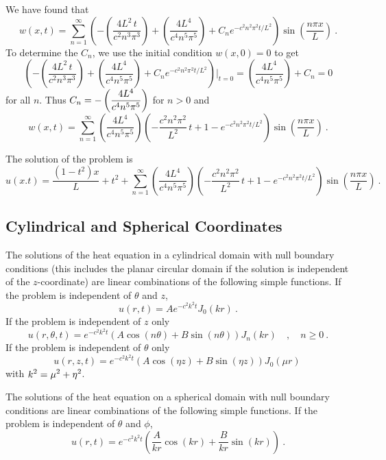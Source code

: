 \begin{egg}
We have found that
\[
w(x,t) = \sum_{n=1}^\infty \left(
-\left(\frac{4L^2\,t}{c^2n^3\pi^3}\right)
+ \left(\frac{4L^4}{c^4n^5\pi^5}\right) + C_n e^{-c^2n^2\pi^2 t/L^2}
\right) \sin\left(\frac{n\pi x}{L}\right) \  .
\]
To determine the $C_n$, we use the initial condition $w(x,0)=0$ to
get
\[
\left(-\left(\frac{4L^2\,t}{c^2n^3\pi^3}\right)
+ \left(\frac{4L^4}{c^4n^5\pi^5}\right) + C_n e^{-c^2n^2\pi^2 t/L^2}
\right)\bigg|_{t=0} = \left(\frac{4L^4}{c^4n^5\pi^5}\right) +
C_n = 0
\]
for all $n$.  Thus
$\displaystyle C_n = -\left(\frac{4L^4}{c^4n^5\pi^5}\right)$ for $n>0$
and
\[
w(x,t) = \sum_{n=1}^\infty \left(\frac{4L^4}{c^4n^5\pi^5}\right)
\left( -\frac{c^2n^2\pi^2}{L^2}\, t + 1 - e^{-c^2n^2\pi^2 t/L^2}\right)
\sin\left(\frac{n\pi x}{L}\right) \  .
\]

The solution of the problem is
\[
u(x.t) = \frac{(1-t^2)x}{L} + t^2 +
\sum_{n=1}^\infty \left(\frac{4L^4}{c^4n^5\pi^5}\right)
\left( -\frac{c^2n^2\pi^2}{L^2}\, t + 1 - e^{-c^2n^2\pi^2 t/L^2}\right)
\sin\left(\frac{n\pi x}{L}\right) \  .
\]
\end{egg}

\subsection{Cylindrical and Spherical Coordinates}

\begin{rmk}
The solutions of the heat equation in a cylindrical domain with null
boundary conditions (this includes the planar circular domain if the
solution is independent of the $z$-coordinate) are linear combinations
of the following simple functions.  If the problem is independent of
$\theta$ and $z$,
\[
u(r,t) = A e^{-c^2 k^2 t} J_0(k r) \ .
\]
If the problem is independent of $z$ only
\[
u(r,\theta,t) = e^{-c^2 k^2 t}
\left(A \cos(n \theta) + B \sin (n \theta)\right) J_n(k r) \quad ,
\quad n \geq 0 \ .
\]
If the problem is independent of $\theta$ only
\[
u(r,z,t) = e^{-c^2 k^2 t}
\left(A \cos (\eta z) + B \sin (\eta z)\right)J_0(\mu r)\
\]
with $\displaystyle k^2 = \mu^2 + \eta^2$.
\end{rmk}

\begin{rmk}
The solutions of the heat equation on a spherical domain with null
boundary conditions are linear combinations of the following simple
functions.  If the problem is independent of $\theta$ and $\phi$,
\[
u(r,t) = e^{-c^2 k^2 t} \left(\frac{A}{k r}
\cos(k r) + \frac{B}{k r} \sin (k r)\right) \ .
\]
\end{rmk}

